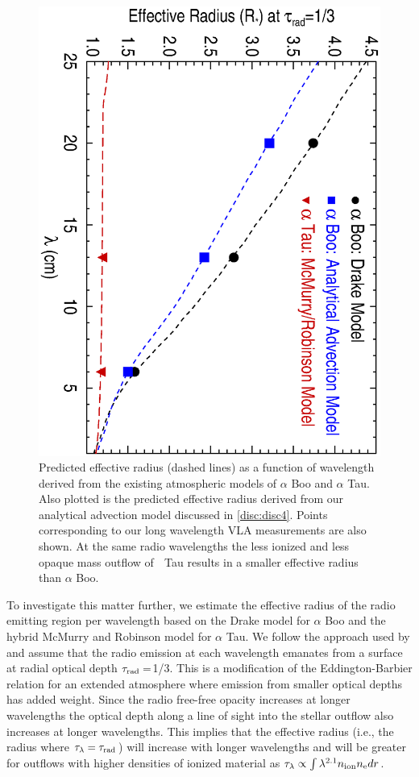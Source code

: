 \documentclass[iop]{emulateapj}
\begin{document}
\begin{figure}
\includegraphics[trim = 5mm 0mm 10mm 20mm, clip,scale=0.4,angle=90]{fig5.ps}
\caption{Predicted effective radius (dashed lines) as a function of wavelength derived from the existing atmospheric models of $\alpha$ Boo and $\alpha$ Tau.  Also plotted is the predicted effective radius derived from our analytical advection model discussed in \ref{disc:disc4}. Points corresponding to our long wavelength VLA measurements are also shown. At the same radio wavelengths the less ionized and less opaque mass outflow of  Tau results in a smaller effective radius than $\alpha$ Boo.}
\label{fig:fig5}
\end{figure}

To investigate this matter further,  we estimate the effective radius of the radio emitting region per wavelength based on the Drake model for $\alpha$ Boo and the hybrid McMurry and Robinson model for $\alpha$ Tau. We follow the approach used by \cite{1977ApJ...212..488C} and assume that the radio emission at each wavelength emanates from a surface at radial optical depth $\tau _{\rm{rad}}=$1/3. This is a modification of the Eddington-Barbier relation for an extended atmosphere where emission from smaller optical depths has added weight. Since the radio free-free opacity increases at longer wavelengths the optical depth along a line of sight into the stellar outflow also increases at longer wavelengths. This implies that the effective radius (i.e., the radius where $\tau _{\lambda} = \tau _{\rm{rad}}$) will increase with longer wavelengths and will be greater for outflows with higher densities of ionized material as $\tau _{\lambda} \propto \int \lambda ^{2.1}n_{\rm{ion}}n_{\rm{e}} dr$. 
\end{document}
